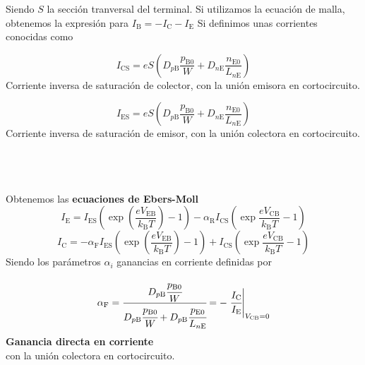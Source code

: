 Siendo $S$ la sección tranversal del terminal. Si utilizamos la ecuación de malla, obtenemos la expresión para $I_\mathrm{B}=-I_\mathrm{C}-I_\mathrm{E}$
\newpage
\noindent Si definimos unas corrientes conocidas como\\
\begin{minipage}{0.45 \textwidth}
    \begin{equation}
        I_\mathrm{CS}=eS\left(D_{p \mathrm{B}} \frac{p_{\mathrm{B} 0}}{W}+D_{n \mathrm{E}} \frac{n_{\mathrm{E} 0}}{L_{n \mathrm{E}}}\right)
    \end{equation}
    Corriente inversa de saturación de colector, con la unión emisora en cortocircuito.
\end{minipage}
\hfill
\begin{minipage}{0.45 \textwidth}
    \begin{equation}
        I_\mathrm{ES}=eS\left(D_{p \mathrm{B}} \frac{p_{\mathrm{B} 0}}{W}+D_{n \mathrm{E}} \frac{n_{\mathrm{E} 0}}{L_{n \mathrm{E}}}\right)
    \end{equation}
    Corriente inversa de saturación de emisor, con la unión colectora en cortocircuito.
\end{minipage}
\\\\\\
Obtenemos las \textbf{ecuaciones de Ebers-Moll}
\begin{equation}
    I_\mathrm{E}=I_\mathrm{ES} \left(\exp{\left(\frac{eV_\mathrm{EB}}{k_\mathrm{B}T} \right)}-1 \right)-\alpha_\mathrm{R} I_\mathrm{CS}\left( \exp \frac{eV_\mathrm{CB}}{k_\mathrm{B}T}-1 \right)
    \label{eq:Corriente de Emisor EbersMoll}
\end{equation}
\begin{equation}
    I_\mathrm{C}=-\alpha_\mathrm{F}I_\mathrm{ES} \left(\exp{\left(\frac{eV_\mathrm{EB}}{k_\mathrm{B}T} \right)}-1 \right)+ I_\mathrm{CS}\left(\exp \frac{eV_\mathrm{CB}}{k_\mathrm{B}T}-1 \right)
    \label{eq:Corriente de Colector EbersMoll}
\end{equation}
Siendo los parámetros $\alpha_i$ ganancias en corriente definidas por \\
\begin{minipage}{0.5\textwidth}
    \begin{equation}
\alpha_\mathrm{F}=\cfrac{D_{p \mathrm{B}} \cfrac{p_{\mathrm{B} 0}}{W}}{D_{p \mathrm{B}} \cfrac{p_{\mathrm{B} 0}}{W}+D_{p \mathrm{B}} \cfrac{p_{\mathrm{E} 0}}{L_{n\mathrm{E}}}}=-\left. \cfrac{I_\mathrm{C}}{I_\mathrm{E}}\right |_{V_\mathrm{CB}=0}
\label{eq: Ganancia directa en corriente}
    \end{equation}
    \textbf{Ganancia directa en corriente} \\ con la unión colectora en cortocircuito.
\end{minipage}

